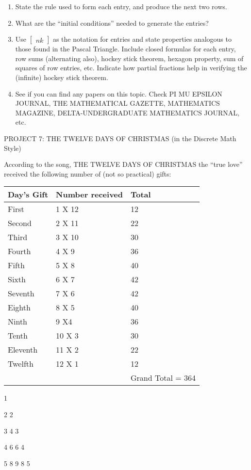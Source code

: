 \documentclass[10pt,letter]{article}
\begin{document}
\begin{enumerate}
\def\labelenumi{\arabic{enumi}.}

\item
  State the rule used to form each entry, and produce the next two rows.
\item
  What are the ``initial conditions'' needed to generate the entries?
\item
  Use \(\begin{bmatrix}
  n
  k
  \end{bmatrix}
\) as the notation for entries and state properties
  analogous to those found in the Pascal Triangle. Include closed
  formulas for each entry, row sums (alternating also), hockey stick
  theorem, hexagon property, sum of squares of row entries, etc.
  Indicate how partial fractions help in verifying the (infinite) hockey
  stick theorem.
\item
  See if you can find any papers on this topic. Check PI MU EPSILON
  JOURNAL, THE MATHEMATICAL GAZETTE, MATHEMATICS MAGAZINE,
  DELTA-UNDERGRADUATE MATHEMATICS JOURNAL, etc.

\end{enumerate}

PROJECT 7: THE TWELVE DAYS OF CHRISTMAS (in the Discrete Math Style)

According to the song, THE TWELVE DAYS OF CHRISTMAS the ``true love''
received the following number of (not so practical) gifts:
\begin{longtable}[]{@{}lll@{}}
\toprule
Day's Gift & Number received & Total\tabularnewline
\midrule
\endhead
First & 1 X 12 & 12\tabularnewline
Second & 2 X 11 & 22\tabularnewline
Third & 3 X 10 & 30\tabularnewline
Fourth & 4 X 9 & 36\tabularnewline
Fifth & 5 X 8 & 40\tabularnewline
Sixth & 6 X 7 & 42\tabularnewline
Seventh & 7 X 6 & 42\tabularnewline
Eighth & 8 X 5 & 40\tabularnewline
Ninth & 9 X4 & 36\tabularnewline
Tenth & 10 X 3 & 30\tabularnewline
Eleventh & 11 X 2 & 22\tabularnewline
Twelfth & 12 X 1 & 12\tabularnewline
& & Grand Total = 364\tabularnewline
\bottomrule

\end{longtable}

1

2 2

3 4 3

4 6 6 4

5 8 9 8 5
\end{document}
